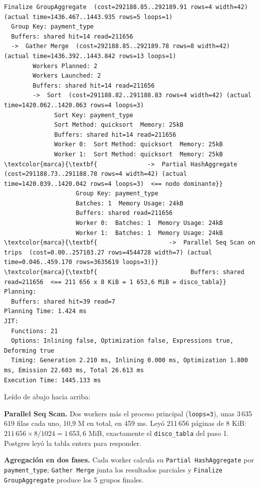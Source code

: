 \documentclass[10pt,letterpaper]{article}
\begin{document}
\begin{Verbatim}[fontsize=\fontsize{6}{7.2}\selectfont,commandchars=\\\{\}]
Finalize GroupAggregate  (cost=292188.85..292189.91 rows=4 width=42) (actual time=1436.467..1443.935 rows=5 loops=1)
  Group Key: payment_type
  Buffers: shared hit=14 read=211656
  ->  Gather Merge  (cost=292188.85..292189.78 rows=8 width=42) (actual time=1436.392..1443.842 rows=13 loops=1)
        Workers Planned: 2
        Workers Launched: 2
        Buffers: shared hit=14 read=211656
        ->  Sort  (cost=291188.82..291188.83 rows=4 width=42) (actual time=1420.062..1420.063 rows=4 loops=3)
              Sort Key: payment_type
              Sort Method: quicksort  Memory: 25kB
              Buffers: shared hit=14 read=211656
              Worker 0:  Sort Method: quicksort  Memory: 25kB
              Worker 1:  Sort Method: quicksort  Memory: 25kB
\textcolor{marca}{\textbf{              ->  Partial HashAggregate  (cost=291188.73..291188.78 rows=4 width=42) (actual time=1420.039..1420.042 rows=4 loops=3)  <== nodo dominante}}
                    Group Key: payment_type
                    Batches: 1  Memory Usage: 24kB
                    Buffers: shared read=211656
                    Worker 0:  Batches: 1  Memory Usage: 24kB
                    Worker 1:  Batches: 1  Memory Usage: 24kB
\textcolor{marca}{\textbf{                    ->  Parallel Seq Scan on trips  (cost=0.00..257103.27 rows=4544728 width=7) (actual time=0.046..459.170 rows=3635619 loops=3)}}
\textcolor{marca}{\textbf{                          Buffers: shared read=211656  <== 211 656 x 8 KiB = 1 653,6 MiB = disco_tabla}}
Planning:
  Buffers: shared hit=39 read=7
Planning Time: 1.424 ms
JIT:
  Functions: 21
  Options: Inlining false, Optimization false, Expressions true, Deforming true
  Timing: Generation 2.210 ms, Inlining 0.000 ms, Optimization 1.800 ms, Emission 22.603 ms, Total 26.613 ms
Execution Time: 1445.133 ms
\end{Verbatim}

Leído de abajo hacia arriba:

\textbf{Parallel Seq Scan.} Dos workers más el proceso principal (\texttt{loops=3}), unas 3\,635\,619
filas cada uno, 10,9 M en total, en 459 ms. Leyó 211\,656 páginas de 8 KiB:
$211\,656 \times 8 / 1024 = 1\,653{,}6$ MiB, exactamente el \texttt{disco\_tabla} del paso 1. Postgres
leyó la tabla entera para responder.

\textbf{Agregación en dos fases.} Cada worker calcula su \texttt{Partial HashAggregate} por
\texttt{payment\_type}; \texttt{Gather Merge} junta los resultados parciales y
\texttt{Finalize GroupAggregate} produce los 5 grupos finales.
\end{document}
